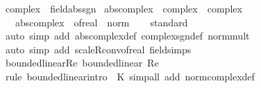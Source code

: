 \begin{isabellebody}
{}
\isamarkuptrue%
%
\endisatagdocument
{\isafolddocument}%
%
\isadelimdocument
%
\endisadelimdocument
{}\isamarkupfalse%
\ complex\ {\isacharcolon}{\kern0pt}{\isacharcolon}{\kern0pt}\ field{\isacharunderscore}{\kern0pt}abs{\isacharunderscore}{\kern0pt}sgn\isanewline
{}\isanewline
\isanewline
{}\isamarkupfalse%
\ abs{\isacharunderscore}{\kern0pt}complex\ {\isacharcolon}{\kern0pt}{\isacharcolon}{\kern0pt}\ {\isachardoublequoteopen}complex\ {\isasymRightarrow}\ complex{\isachardoublequoteclose}\isanewline
\ \ \ {\isachardoublequoteopen}abs{\isacharunderscore}{\kern0pt}complex\ {\isacharequal}{\kern0pt}\ of{\isacharunderscore}{\kern0pt}real\ {\isasymcirc}\ norm{\isachardoublequoteclose}\isanewline
\isanewline
{}\isamarkupfalse%
\isanewline
%
\isadelimproof
\ \ %
\endisadelimproof
%
\isatagproof
{}\isamarkupfalse%
\ standard\isanewline
\ \ \ \ \ \ \ \ \ \isamarkupfalse%
\ {\isacharparenleft}{\kern0pt}auto\ simp\ add{\isacharcolon}{\kern0pt}\ abs{\isacharunderscore}{\kern0pt}complex{\isacharunderscore}{\kern0pt}def\ complex{\isacharunderscore}{\kern0pt}sgn{\isacharunderscore}{\kern0pt}def\ norm{\isacharunderscore}{\kern0pt}mult{\isacharparenright}{\kern0pt}\isanewline
\ \ \isamarkupfalse%
\ {\isacharparenleft}{\kern0pt}auto\ simp\ add{\isacharcolon}{\kern0pt}\ scaleR{\isacharunderscore}{\kern0pt}conv{\isacharunderscore}{\kern0pt}of{\isacharunderscore}{\kern0pt}real\ field{\isacharunderscore}{\kern0pt}simps{\isacharparenright}{\kern0pt}\isanewline
\ \ \isamarkupfalse%
%
\endisatagproof
{\isafoldproof}%
%
\isadelimproof
\isanewline
%
\endisadelimproof
\isanewline
{}\isamarkupfalse%
%
\isadelimdocument
%
\endisadelimdocument
%
\isatagdocument
%
\isamarkuptrue%
%
\endisatagdocument
{\isafolddocument}%
%
\isadelimdocument
%
\endisadelimdocument
{}\isamarkupfalse%
\ bounded{\isacharunderscore}{\kern0pt}linear{\isacharunderscore}{\kern0pt}Re{\isacharcolon}{\kern0pt}\ {\isachardoublequoteopen}bounded{\isacharunderscore}{\kern0pt}linear\ Re{\isachardoublequoteclose}\isanewline
%
\isadelimproof
\ \ %
\endisadelimproof
%
\isatagproof
{}\isamarkupfalse%
\ {\isacharparenleft}{\kern0pt}rule\ bounded{\isacharunderscore}{\kern0pt}linear{\isacharunderscore}{\kern0pt}intro\ {\isacharbrackleft}{\kern0pt}\ K{\isacharequal}{\kern0pt}{}{\isacharbrackright}{\kern0pt}{\isacharparenright}{\kern0pt}\ {\isacharparenleft}{\kern0pt}simp{\isacharunderscore}{\kern0pt}all\ add{\isacharcolon}{\kern0pt}\ norm{\isacharunderscore}{\kern0pt}complex{\isacharunderscore}{\kern0pt}def{\isacharparenright}{\kern0pt}%

\end{isabellebody}
